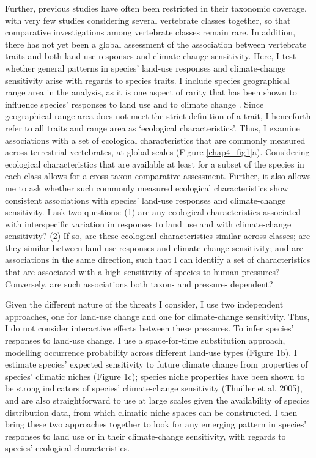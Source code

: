 Further, previous studies have often been restricted in their taxonomic coverage, with very few studies considering several vertebrate classes together, so that comparative investigations among vertebrate classes remain rare. In addition, there has not yet been a global assessment of the association between vertebrate traits and both land-use responses and climate-change sensitivity. Here, I test whether general patterns in species' land-use responses and climate-change sensitivity arise with regards to species traits. I include species geographical range area in the analysis, as it is one aspect of rarity that has been shown to influence species' responses to land use and to climate change \citep{Thuiller2005, Newbold2018}. Since geographical range area does not meet the strict definition of a trait, I henceforth refer to all traits and range area as `ecological characteristics'. Thus, I examine associations with a set of ecological characteristics that are commonly measured across terrestrial vertebrates, at global scales (Figure \ref{chap4_fig1}a). Considering ecological characteristics that are available at least for a subset of the species in each class allows for a cross-taxon comparative assessment. Further, it also allows me to ask whether such commonly measured ecological characteristics show consistent associations with species' land-use responses and climate-change sensitivity. I ask two questions: (1) are any ecological characteristics  associated with interspecific variation in responses  to land use and with climate-change sensitivity? (2) If so, are these ecological characteristics  similar across classes; are they similar between land-use responses and climate-change sensitivity; and are associations in the same direction, such that I can identify a set of characteristics that  are associated with a high sensitivity of species to human pressures? Conversely, are such associations both taxon- and pressure- dependent?

Given the different nature of the threats I consider, I use two independent approaches, one for land-use change and one for climate-change sensitivity. Thus, I do not consider interactive effects between these pressures. To infer species' responses to land-use change, I use a space-for-time substitution approach, modelling occurrence probability across different land-use types (Figure 1b). I estimate species' expected sensitivity to future climate change from properties of species' climatic niches (Figure 1c); species niche properties have been shown to be strong indicators of species' climate-change sensitivity (Thuiller et al. 2005), and are also straightforward to use at large scales given the availability of species distribution data, from which climatic niche spaces can be constructed. I then bring these two approaches together to look for any emerging pattern in species' responses to land use or in their climate-change  sensitivity, with regards to species' ecological characteristics.
 
